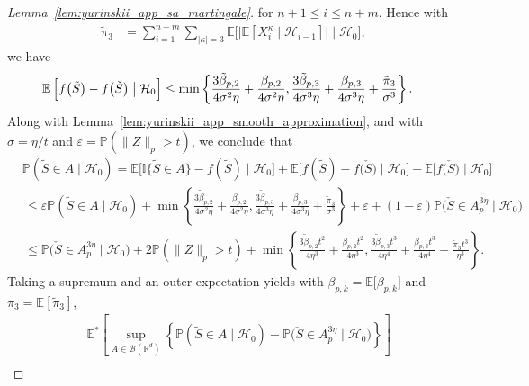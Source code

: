 \documentclass[11pt,lof]{puthesis}
\renewcommand{\P}{\ensuremath{\mathbb{P}}}
\newcommand{\R}{\ensuremath{\mathbb{R}}}
\newcommand{\E}{\ensuremath{\mathbb{E}}}
\newcommand{\I}{\ensuremath{\mathbb{I}}}
\newcommand{\cH}{\ensuremath{\mathcal{H}}}
\newcommand{\cB}{\ensuremath{\mathcal{B}}}
\theoremstyle{break}
\theoremstyle{proof}
\newtheorem{proof}{Proof}
\begin{document}
\begin{proof}[Lemma~\ref{lem:yurinskii_app_sa_martingale}]
  for $n+1 \leq i \leq n+m$.
  Hence with
  \begin{align*}
    \tilde \pi_3
    &=
    \sum_{i=1}^{n+m}
    \sum_{|\kappa| = 3}
    \E \Big[ \big|
      \E \left[ X_i^\kappa \mid \cH_{i-1} \right]
    \big| \mid \cH_0 \Big],
  \end{align*}
  we have
  \begin{align*}
    \E\left[
      f\big(\tilde S\big) - f\big(\check S\big)
      \bigm| \cH_0
    \right]
    &\leq
    \min \left\{
      \frac{3 \tilde \beta_{p,2}}{4 \sigma^2 \eta}
      + \frac{\beta_{p,2}}{4 \sigma^2 \eta},
      \frac{3 \tilde \beta_{p,3}}{4 \sigma^3 \eta}
      + \frac{\beta_{p,3}}{4 \sigma^3 \eta}
      + \frac{\tilde \pi_3}{\sigma^3}
    \right\}.
  \end{align*}
  Along with Lemma~\ref{lem:yurinskii_app_smooth_approximation}, and with
  $\sigma = \eta / t$ and $\varepsilon = \P(\|Z\|_p > t)$,
  we conclude that
  \begin{align*}
    &\P(\tilde S \in A \mid \cH_0)
    =
    \E\big[\I\{\tilde S \in A\} - f(\tilde S)
      \mid \cH_0
    \big]
    + \E\big[f(\tilde S) - f\big(\check S\big)
      \mid \cH_0
    \big]
    + \E \big[f\big(\check S\big)
      \mid \cH_0
    \big] \\
    &\,\leq
    \varepsilon\P(\tilde S \in A
    \mid \cH_0)
    + \min \! \left\{
      \frac{3 \tilde \beta_{p,2}}{4 \sigma^2 \eta}
      + \frac{\beta_{p,2}}{4 \sigma^2 \eta},
      \frac{3 \tilde \beta_{p,3}}{4 \sigma^3 \eta}
      + \frac{\beta_{p,3}}{4 \sigma^3 \eta}
      + \frac{\tilde \pi_3}{\sigma^3}
    \right\}
    +
    \varepsilon
    + (1 - \varepsilon) \P\big(\check S \in A_p^{3\eta}
      \mid \cH_0
    \big) \\
    &\,\leq
    \P\big( \check S \in A_p^{3\eta}
      \mid \cH_0
    \big)
    + 2 \P(\|Z\|_p > t)
    + \min\!\left\{
      \frac{3 \tilde \beta_{p,2} t^2}{4 \eta^3}
      + \frac{\beta_{p,2} t^2}{4 \eta^3},
      \frac{3 \tilde \beta_{p,3} t^3}{4 \eta^4}
      + \frac{\beta_{p,3} t^3}{4 \eta^4}
      + \frac{\tilde \pi_3 t^3}{\eta^3}
    \right\}.
  \end{align*}
  Taking a supremum and an outer expectation yields
  with $\beta_{p,k} = \E\big[\tilde \beta_{p,k}\big]$
  and $\pi_3 = \E[\tilde \pi_3]$,
  \begin{align*}
    &\E^* \left[
      \sup_{A \in \cB(\R^d)}
      \left\{
        \P(\tilde S \in A \mid \cH_0)
        - \P\big( \check S \in A_p^{3\eta} \mid \cH_0 \big)
      \right\}
    \right] \\

\end{align*}
\end{proof}
\end{document}
